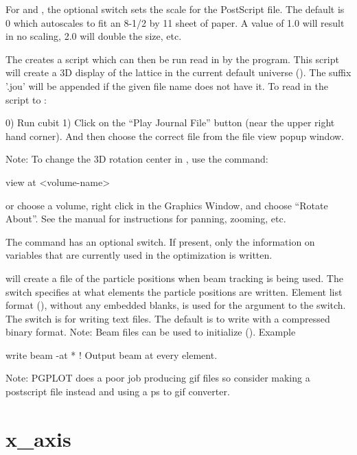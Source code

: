 {{{For  and , the optional  switch sets the
scale for the PostScript file. The default is 0 which autoscales to fit an
8-1/2 by 11 sheet of paper. A value of 1.0 will result in no scaling,
2.0 will double the size, etc.

The  creates a script which can then be run
read in by the  program\cite{b:cubit}. This script will
create a 3D display of the lattice in the current default universe
(). The suffix '.jou' will be appended if the given
file name does not have it. To read in the script to :
\begin{example}
  0) Run cubit
  1) Click on the ``Play Journal File'' button (near the upper right hand corner).
     And then choose the correct file from the file view popup window.
\end{example}
Note: To change the 3D rotation center in , use the command:
\begin{example}
  view at <volume-name>
\end{example}
or choose a volume, right click in the Graphics Window, and choose
``Rotate About''.  See the  manual for instructions
for panning, zooming, etc.

The  command has an optional 
switch.  If present, only the information on variables that are
currently used in the optimization is written.

 will create a file of the particle positions when
beam tracking is being used. The  switch specifies at what
elements the particle positions are written. Element list format
(), without any embedded blanks, is used for
the  argument to the  switch. The
 switch is for writing text files. The default is to write
with a compressed binary format.  Note: Beam files can be used to
initialize \tao (). Example
\begin{example}
  write beam -at *   ! Output beam at every element.
\end{example}

Note: PGPLOT does a poor job producing gif files so consider
making a postscript file instead and using a ps to gif converter.

\section{x_axis}
\label{s:x.axis}

}}}
